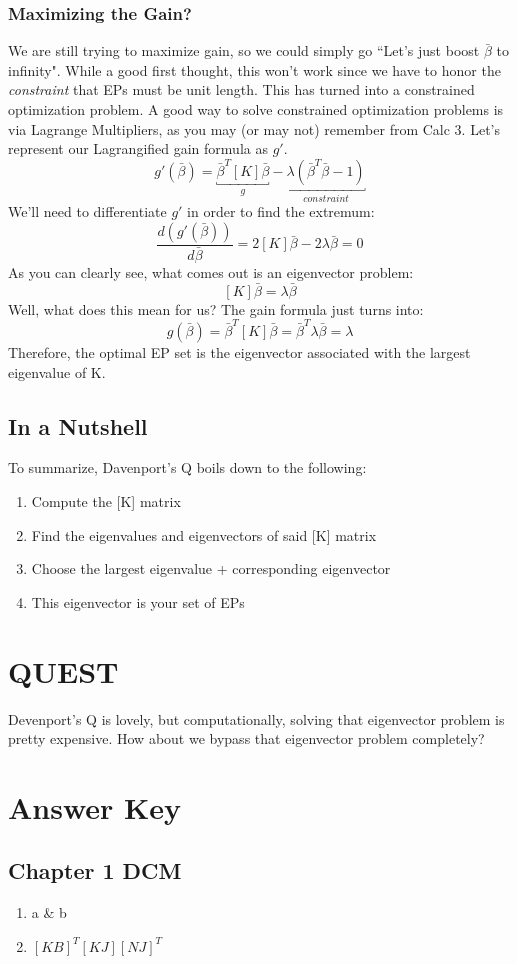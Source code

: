 \documentclass[a4paper,14pt]{extreport}
\begin{document}
\subsection{Maximizing the Gain?}
We are still trying to maximize gain, so we could simply go ``Let's just boost $\bar{\beta}$ to infinity". While a good first thought, this won't work since we have to honor the \emph{constraint} that EPs must be unit length. This has turned into a constrained optimization problem. A good way to solve constrained optimization problems is via Lagrange Multipliers, as you may (or may not) remember from Calc 3. Let's represent our Lagrangified gain formula as $g'$.
\[
g'(\bar{\beta}) = \underbracket{\bar{\beta}^T[K]\bar{\beta}}_{g} - \underbracket{\lambda(\bar{\beta}^T\bar{\beta}-1)}_{constraint}
\]
We'll need to differentiate $g'$ in order to find the extremum:
\[
\dfrac{d(g'(\bar{\beta}))}{d\bar{\beta}} = 2[K]\bar{\beta} - 2\lambda\bar{\beta}=0
\]
As you can clearly see, what comes out is an eigenvector problem:
\[
[K]\bar{\beta}=\lambda\bar{\beta}
\]
Well, what does this mean for us? The gain formula just turns into:
\[
g(\bar{\beta}) = \bar{\beta}^T[K]\bar{\beta} = \bar{\beta}^T\lambda\bar{\beta} = \lambda
\]Therefore, the optimal EP set is the eigenvector associated with the largest eigenvalue of K.
\section{In a Nutshell}

To summarize, Davenport's Q boils down to the following:
\begin{enumerate}
\item{Compute the [K] matrix}
\item{Find the eigenvalues and eigenvectors of said [K] matrix}
\item{Choose the largest eigenvalue + corresponding eigenvector}
\item{This eigenvector is your set of EPs}
\end{enumerate}

\chapter{QUEST}
Devenport's Q is lovely, but computationally, solving that eigenvector problem is pretty expensive. How about we bypass that eigenvector problem completely?
\chapter{Answer Key}
\section{Chapter 1 DCM}
\begin{enumerate}
\item{a \& b}
\item{$[KB]^T[KJ][NJ]^T$}


\end{enumerate}
\end{document}
